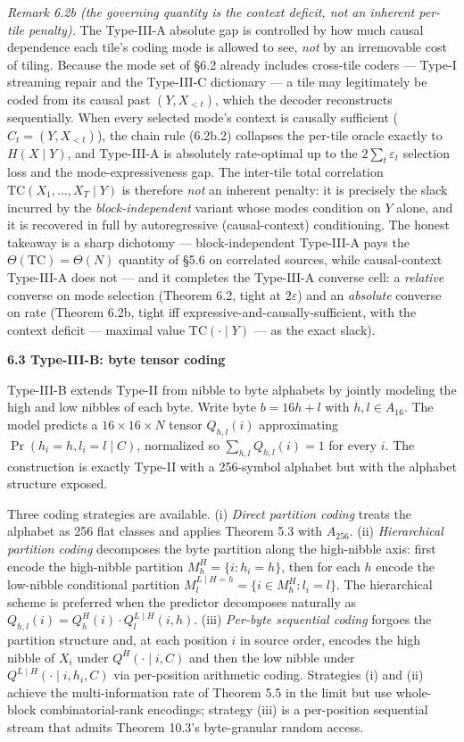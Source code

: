 \documentclass[
]{article}
\begin{document}
\emph{Remark 6.2b (the governing quantity is the context deficit, not an
inherent per-tile penalty).} The Type-III-A absolute gap is controlled
by how much causal dependence each tile's coding mode is allowed to see,
\emph{not} by an irremovable cost of tiling. Because the mode set of
§6.2 already includes cross-tile coders --- Type-I streaming repair and
the Type-III-C dictionary --- a tile may legitimately be coded from its
causal past $(Y, X_{<t})$, which the decoder reconstructs sequentially.
When every selected mode's context is causally sufficient
($C_t = (Y, X_{<t})$), the chain rule (6.2b.2) collapses the per-tile
oracle exactly to $H(X \mid Y)$, and Type-III-A is absolutely
rate-optimal up to the $2\sum_t \varepsilon_t$ selection loss and the
mode-expressiveness gap. The inter-tile total correlation
$\mathrm{TC}(X_1,\ldots,X_T \mid Y)$ is therefore \emph{not} an inherent
penalty: it is precisely the slack incurred by the \emph{block-independent}
variant whose modes condition on $Y$ alone, and it is recovered in full
by autoregressive (causal-context) conditioning. The honest takeaway is
a sharp dichotomy --- block-independent Type-III-A pays the
$\Theta(\mathrm{TC}) = \Theta(N)$ quantity of §5.6 on correlated sources,
while causal-context Type-III-A does not --- and it completes the
Type-III-A converse cell: a \emph{relative} converse on mode selection
(Theorem 6.2, tight at $2\varepsilon$) and an \emph{absolute} converse on
rate (Theorem 6.2b, tight iff expressive-and-causally-sufficient, with
the context deficit --- maximal value $\mathrm{TC}(\cdot \mid Y)$ --- as
the exact slack).

\textbf{6.3 Type-III-B: byte tensor coding}

Type-III-B extends Type-II from nibble to byte alphabets by jointly
modeling the high and low nibbles of each byte. Write byte
$b = 16h + l$ with $h, l \in A_{16}$. The model predicts a
$16 \times 16 \times N$ tensor $Q_{h,l}(i)$ approximating
$\Pr(h_i = h, l_i = l \mid C)$, normalized so $\sum_{h,l} Q_{h,l}(i) =
1$ for every $i$. The construction is exactly Type-II with a 256-symbol
alphabet but with the alphabet structure exposed.

Three coding strategies are available. (i) \emph{Direct partition
coding} treats the alphabet as 256 flat classes and applies
Theorem 5.3 with $A_{256}$. (ii) \emph{Hierarchical partition
coding} decomposes the byte partition along the high-nibble axis:
first encode the high-nibble partition
$M^H_h = \{ i : h_i = h \}$, then for each $h$ encode the
low-nibble conditional partition
$M^{L \mid H = h}_l = \{ i \in M^H_h : l_i = l \}$. The
hierarchical scheme is preferred when the predictor decomposes
naturally as
$Q_{h,l}(i) = Q^H_h(i) \cdot Q^{L \mid H}_l(i, h)$. (iii)
\emph{Per-byte sequential coding} forgoes the partition structure
and, at each position $i$ in source order, encodes the high
nibble of $X_i$ under $Q^H(\cdot \mid i, C)$ and then the low
nibble under $Q^{L \mid H}(\cdot \mid i, h_i, C)$ via per-position
arithmetic coding. Strategies (i) and (ii) achieve the
multi-information rate of Theorem 5.5 in the limit but use
whole-block combinatorial-rank encodings; strategy (iii) is a
per-position sequential stream that admits Theorem 10.3's
byte-granular random access.
\end{document}
